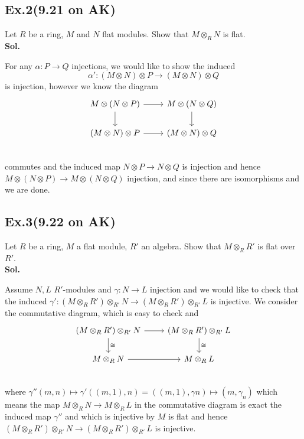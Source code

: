 \documentclass[lang=en,11pt,a4paper,citestyle =authoryear]{elegantpaper}
\begin{document}
\subsection*{Ex.2(9.21 on AK)} 
Let $R$ be a ring, $M$ and $N$ flat modules. Show that $M\otimes_R N$ is flat.
\vspace{0.5em}\\
\textbf{Sol.} \par
For any $\alpha: P\to Q$ injections, we would like to show the induced
\[
\alpha': (M\otimes N) \otimes P \to (M\otimes N) \otimes Q
\]
is injection, however we know the diagram
\[
\begin{tikzcd}
    M \otimes (N \otimes P)\arrow[d]\arrow[r] & M\otimes (N \otimes Q)\arrow[d] \\
(M\otimes N) \otimes P\arrow[r] & (M\otimes N) \otimes Q \\
\end{tikzcd}
\]
commutes and the induced map $N\otimes P \to N\otimes Q$ is injection and hence $M\otimes(N\otimes P) \to M\otimes (N\otimes Q)$ injection, and since there are isomorphisms and we are done.
\par 
\vspace{0.5em}

\subsection*{Ex.3(9.22 on AK)} 
Let $R$ be a ring, $M$ a flat module, $R'$ an algebra. Show that $M\otimes_R R'$ is flat over $R'$.
\vspace{0.5em}\\
\textbf{Sol.} \par
Assume $N,L$ $R'$-modules and $\gamma: N\to L$ injection and we would like to check that the induced $\gamma':(M\otimes_R R')\otimes_{R'} N \to (M\otimes_R R')\otimes_{R'} L$ is injective. We consider the commutative diagram, which is easy to check and
\[
\begin{tikzcd}
    (M\otimes_R R')\otimes_{R'} N\arrow[d,"\cong"]\arrow[r] & (M\otimes_R R')\otimes_{R'} L\arrow[d,"\cong"] \\
M \otimes_R N\arrow[r] & M\otimes_R L \\
\end{tikzcd}
\]
where $\gamma''(m,n) \mapsto \gamma'((m,1),n) = ((m,1),\gamma n)\mapsto (m,\gamma_n)$
which means the map $M\otimes_R N \to M\otimes_R L$ in the commutative diagram is exact the induced map $\gamma''$ and which is injective by $M$ is flat and hence $(M\otimes_R R')\otimes_{R'} N\to (M\otimes_R R')\otimes_{R'} L$ is injective.
\par 
\vspace{0.5em}
\end{document}

